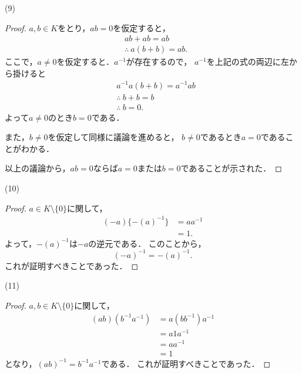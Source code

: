 \documentclass[a4paper,10pt,fleqn]{ltjsarticle}
\begin{document}
\begin{itembox}[c]{(9)}
    \begin{proof}
        $ a, b \in K$をとり，$ab =0$を仮定すると，
        \begin{align*}
            & ab + ab = ab \\
            & \therefore ~ a(b+b)=ab.
        \end{align*} 
        ここで，$a \ne 0$を仮定すると．$a^{-1}$が存在するので，
        $a^{-1}$を上記の式の両辺に左から掛けると
        \begin{align*} 
            & a^{-1}a(b+b)=a^{-1}ab \\
            & \therefore ~ b+b=b \\
            & \therefore ~ b=0.
        \end{align*} 
        よって$a \ne 0$のとき$b=0$である．

        また，$b \ne 0$を仮定して同様に議論を進めると，
        $b \ne 0$であるとき$ a=0$であることがわかる．

        以上の議論から，$ab=0$ならば$a=0$または$b=0$であることが示された．
    \end{proof}
\end{itembox}
\begin{itembox}[c]{(10)}
    \begin{proof}
        $ a \in K \setminus \{ 0 \} $に関して，
        \begin{align*} 
            (-a) \{ -(a)^{-1} \} &= aa^{-1} \\
            & =1.
        \end{align*}
        よって，$-(a)^{-1}$は$-a$の逆元である．
        このことから，
        \[
        (-a)^{-1} = -(a)^{-1}.
        \]
        これが証明すべきことであった．
    \end{proof}
\end{itembox}
\begin{itembox}[c]{(11)}
    \begin{proof}
        $ a ,b\in K \setminus \{ 0 \} $に関して，
        \begin{align*} 
            (ab) (b^{-1} a^{-1}) & = a (bb^{-1}) a^{-1} \\
            & = a1a^{-1} \\
            & = aa^{-1} \\
            & = 1
        \end{align*} 
        となり，$(ab)^{-1} = b^{-1} a^{-1}$である．
        これが証明すべきことであった．
    \end{proof}
\end{itembox}
%
\newpage
\end{document}
